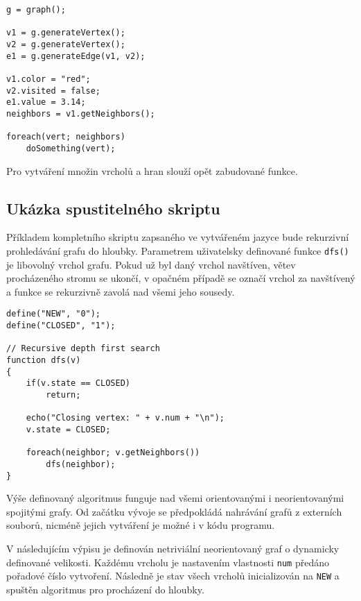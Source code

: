 \documentclass[11pt,twoside,a4paper]{book}
\begin{document}
\begin{verbatim}
g = graph();

v1 = g.generateVertex();
v2 = g.generateVertex();
e1 = g.generateEdge(v1, v2);

v1.color = "red";
v2.visited = false;
e1.value = 3.14;
neighbors = v1.getNeighbors();

foreach(vert; neighbors)
    doSomething(vert);
\end{verbatim}

Pro vytváření množin vrcholů a hran slouží opět zabudované funkce.


\subsection{Ukázka spustitelného skriptu}

Příkladem kompletního skriptu zapsaného ve vytvářeném jazyce bude rekurzivní prohledávání grafu do hloubky. Parametrem uživatelsky definované funkce \texttt{dfs()} je libovolný vrchol grafu. Pokud už byl daný vrchol navštíven, větev procházeného stromu se ukončí, v opačném případě se označí vrchol za navštívený a funkce se rekurzivně zavolá nad všemi jeho sousedy.

\begin{verbatim}
define("NEW", "0");
define("CLOSED", "1");

// Recursive depth first search
function dfs(v)
{
    if(v.state == CLOSED)
        return;

    echo("Closing vertex: " + v.num + "\n");
    v.state = CLOSED;

    foreach(neighbor; v.getNeighbors())
        dfs(neighbor);
}
\end{verbatim}


Výše definovaný algoritmus funguje nad všemi orientovanými i neorientovanými spojitými grafy. Od začátku vývoje se předpokládá nahrávání grafů z externích souborů, nicméně jejich vytváření je možné i v kódu programu.

V následujícím výpisu je definován netriviální neorientovaný graf o dynamicky definované velikosti. Každému vrcholu je nastavením vlastnosti \texttt{num} předáno pořadové číslo vytvoření. Následně je stav všech vrcholů inicializován na \texttt{NEW} a spuštěn algoritmus pro procházení do hloubky.
\end{document}
